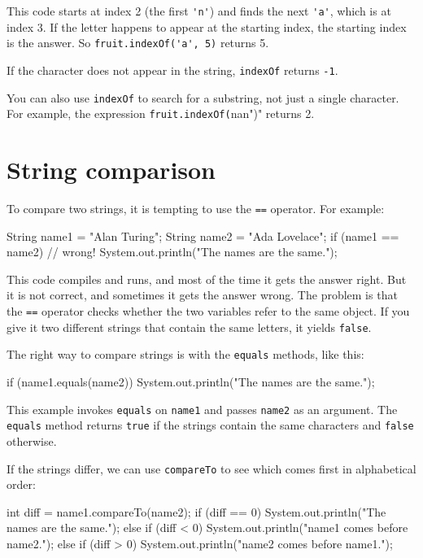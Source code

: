 \documentclass[12pt]{book}
\theoremstyle{exercise}
\newcommand{\java}[1]{\verb"#1"}
\begin{document}
This code starts at index 2 (the first \java{'n'}) and finds the next \java{'a'}, which is at index 3.
If the letter happens to appear at the starting index, the starting index is the answer.
So \java{fruit.indexOf('a', 5)} returns 5.

If the character does not appear in the string, \java{indexOf} returns \java{-1}.

You can also use \java{indexOf} to search for a substring, not just a single character.
For example, the expression \java{fruit.indexOf("nan")} returns 2.


\section{String comparison}
\label{strcmp}


To compare two strings, it is tempting to use the \java{==} operator.
For example:

\begin{code}
    String name1 = "Alan Turing";
    String name2 = "Ada Lovelace";
    if (name1 == name2) {                 // wrong!
        System.out.println("The names are the same.");
    }
\end{code}

This code compiles and runs, and most of the time it gets the answer right.
But it is not correct, and sometimes it gets the answer wrong.
The problem is that the \java{==} operator checks whether the two variables refer to the same object.
If you give it two different strings that contain the same letters, it yields \java{false}.

The right way to compare strings is with the \java{equals} methods, like this:

\begin{code}
    if (name1.equals(name2)) {
        System.out.println("The names are the same.");
    }
\end{code}

This example invokes \java{equals} on \java{name1} and passes \java{name2} as an argument.
The \java{equals} method returns \java{true} if the strings contain the same characters and \java{false} otherwise.

If the strings differ, we can use \java{compareTo} to see which comes first in alphabetical order:

\begin{code}
    int diff = name1.compareTo(name2);
    if (diff == 0) {
        System.out.println("The names are the same.");
    } else if (diff < 0) {
        System.out.println("name1 comes before name2.");
    } else if (diff > 0) {
        System.out.println("name2 comes before name1.");
    }
\end{code}
\end{document}
